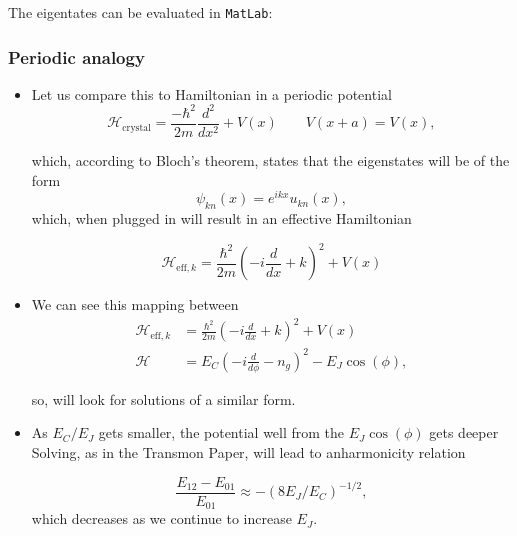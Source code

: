  The eigentates can be evaluated in \verb|MatLab|:


 \subsubsection{Periodic analogy}
 \label{sec:periodic-analogy}

 \begin{itemize}
 \item Let us compare this to Hamiltonian in a periodic potential
   \begin{equation}
     \mathcal{H}_\text{crystal} = \frac{-\hbar^2}{2m}\frac{d^2}{dx^2}+V(x)\qquad V(x+a) = V(x),
   \end{equation}

   \noindent  which,  according  to  Bloch's theorem,  states  that  the
   eigenstates will be of the form
   \begin{equation}
     \psi_{kn}(x) = e^{ikx}u_{kn}(x),
   \end{equation}
   \noindent  which,  when  plugged  in  will  result  in  an  effective
   Hamiltonian

  \begin{equation}
    \mathcal{H}_{\text{eff},k} = \frac{\hbar^2}{2m}\left(-i\frac{d}{dx}+k\right)^2 + V(x)
  \end{equation}
\item We can see this mapping between
  \begin{equation}
    \begin{aligned}
      \mathcal{H}_{\text{eff},k} & = \frac{\hbar^2}{2m}\left(-i\frac{d}{dx}+k\right)^2 + V(x)\\
      \mathcal{H}  &  =   E_C\left(-i\frac{d}{d\phi}  -  n_g\right)^2  -
      E_J\cos(\phi),
    \end{aligned}
  \end{equation}

  \noindent so, will look for solutions of a similar form.
\item  As  $  E_C/E_J  $  gets smaller,  the  potential  well  from  the
  $ E_J\cos(\phi) $ gets deeper    Solving,
  as in the Transmon Paper, will lead to anharmonicity relation

  \begin{framed}\noindent
    \begin{equation}      \frac{E_{12}     -      E_{01}}{E_{01}}\approx
      -(8E_J/E_C)^{-1/2},
    \end{equation}
    \noindent which decreases as we continue to increase $ E_J $.
  \end{framed}
\end{itemize}
\newpage

